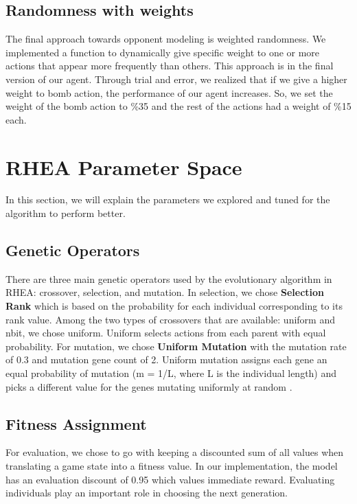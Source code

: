 \documentclass{report}
\begin{document}
	\subsection {Randomness with weights}
	The final approach towards opponent modeling is weighted randomness. We implemented a function to dynamically give specific weight to one or more actions that appear more frequently than others. This approach is in the final version of our agent. Through trial and error, we realized that if we give a higher weight to bomb action, the performance of our agent increases. So, we set the weight of the bomb action to \%35 and the rest of the actions had a weight of \%15 each.


    \section{RHEA Parameter Space}
    In this section, we will explain the parameters we explored and tuned for the algorithm to perform better.

    \subsection{Genetic Operators}
    There are three main genetic operators used by the evolutionary algorithm in RHEA: crossover, selection, and mutation\cite{gaina2021rolling}.
    In selection, we chose \textbf{Selection Rank} which is based on the probability for each individual corresponding to its rank value. Among the two types of crossovers that are available: uniform and nbit, we chose uniform. Uniform selects actions from each parent with equal probability\cite{gaina2021rolling}. For mutation, we chose \textbf{Uniform Mutation} with the mutation rate of 0.3 and mutation gene count of 2.
    Uniform mutation assigns each gene an equal probability of mutation (m = 1/L, where L is the individual length) and picks a different value for the genes mutating uniformly at random \cite{gaina2021rolling}.




	 \subsection {Fitness Assignment}
    For evaluation, we chose to go with keeping a discounted sum of all values when translating a game state into a fitness value. In our implementation, the model has an evaluation discount of 0.95 which values immediate reward. Evaluating individuals play an important role in choosing the next generation.
\end{document}
